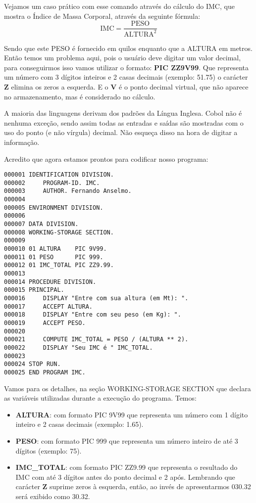 Vejamos um caso prático com esse comando através do cálculo do IMC, que mostra o Índice de Massa Corporal, através da seguinte fórmula: \\
\[
\text{IMC} = \frac{\text{PESO}}{\text{ALTURA}^2}
\]

Sendo que este PESO é fornecido em quilos enquanto que a ALTURA em metros. Então temos um problema aqui, pois o usuário deve digitar um valor decimal, para conseguirmos isso vamos utilizar o formato: \textbf{PIC ZZ9V99}. Que representa um número com 3 dígitos inteiros e 2 casas decimais (exemplo: 51.75) o carácter \textbf{Z} elimina os zeros a esquerda. E o \textbf{V} é o ponto decimal virtual, que não aparece no armazenamento, mas é considerado no cálculo.

\begin{note}
	A maioria das linguagens derivam dos padrões da Língua Inglesa. Cobol não é nenhuma exceção, sendo assim todas as entradas e saídas são mostradas com o uso do ponto (e não vírgula) decimal. Não esqueça disso na hora de digitar a informação.
\end{note}

Acredito que agora estamos prontos para codificar nosso programa:
\begin{lstlisting}[]
000001 IDENTIFICATION DIVISION.
000002     PROGRAM-ID. IMC.
000003     AUTHOR. Fernando Anselmo.
000004
000005 ENVIRONMENT DIVISION.
000006
000007 DATA DIVISION.
000008 WORKING-STORAGE SECTION. 
000009 
000010 01 ALTURA    PIC 9V99.
000011 01 PESO      PIC 999.
000012 01 IMC_TOTAL PIC ZZ9.99.
000013
000014 PROCEDURE DIVISION.
000015 PRINCIPAL.
000016     DISPLAY "Entre com sua altura (em Mt): ".
000017     ACCEPT ALTURA.
000018     DISPLAY "Entre com seu peso (em Kg): ".
000019     ACCEPT PESO.
000020
000021     COMPUTE IMC_TOTAL = PESO / (ALTURA ** 2).
000022     DISPLAY "Seu IMC é " IMC_TOTAL.
000023
000024 STOP RUN.
000025 END PROGRAM IMC.

\end{lstlisting}

Vamos para os detalhes, na seção WORKING-STORAGE SECTION que declara as variáveis utilizadas durante a execução do programa. Temos:
\begin{itemize}
	\item \textbf{ALTURA}: com formato PIC 9V99 que representa um número com 1 dígito inteiro e 2 casas decimais (exemplo: 1.65).
	\item \textbf{PESO}: com formato PIC 999 que representa um número inteiro de até 3 dígitos (exemplo: 75).
	\item \textbf{IMC\_TOTAL}: com formato PIC ZZ9.99 que representa o resultado do IMC com até 3 dígitos antes do ponto decimal e 2 após. Lembrando que carácter \textbf{Z} suprime zeros à esquerda, então, ao invés de apresentarmos 030.32 será exibido como 30.32.
\end{itemize}

